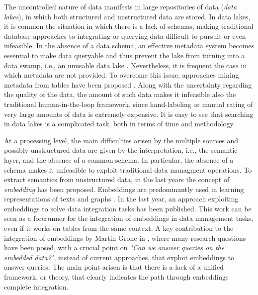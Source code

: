 The uncontrolled nature of data manifests in large repositories of data (\textit{data lakes}), in which both structured and unstructured data are stored. In data lakes, it is common the situation in which there is a lack of schemas, making traditional database approaches to integrating or querying data difficult to pursuit or even infeasible. In the absence of a data schema, an effective metadata system becomes essential to make data queryable and thus prevent the lake from turning into a data swamp, i.e., an unusable data lake \cite{walker2015personal,hai2016constance}. Nevertheless, it is frequent the case in which metadata are not provided. To overcome this issue, approaches mining metadata from tables have been proposed \cite{arocena2015ibench,suriarachchi2016crossing}.
Along with the uncertainty regarding the quality of the data, the amount of such data makes it infeasible also the traditional human-in-the-loop framework, since hand-labeling or manual rating of very large amounts of data is extremely expensive. It is easy to see that searching in data lakes is a complicated task, both in terms of time and methodology. 

At a processing level, the main difficulties arisen by the multiple sources and possibly unstructured data are given by the interpretation, i.e., the semantic layer, and the absence of a common schema. In particular, the absence of a schema makes it unfeasible to exploit traditional data managment operations. To extract semantics from unstructured data, in the last years the concept of \textit{embedding} has been proposed. Embeddings are predominantly used in learning representations of texts \cite{Mikolov2013EfficientEO} and graphs \cite{NIPS2017_7213}. In the last year, an approach exploiting embeddings to solve data integration tasks \cite{cappuzzo2020creating} has been published. This work can be seen as a forerunner for the integration of embeddings in data management tasks, even if it works on tables from the same context. A key contribution to the integration of embeddings by Martin Grohe in \cite{grohe2020word2vec}, where many research questions have been posed, with a crucial point on \textit{"Can we answer queries on the embedded data?"}, instead of current approaches, that exploit embeddings to answer queries. The main point arisen is that there is a lack of a unified framework, or theory, that clearly indicates the path through embeddings complete integration. 


